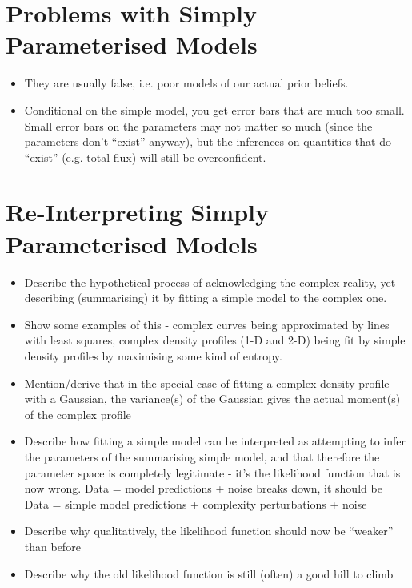 \documentclass[letterpaper, 11pt]{article}
\begin{document}
\section{Problems with Simply Parameterised Models}
\begin{itemize}
\item They are usually false, i.e. poor models of our actual prior beliefs. \\
\item Conditional on the simple model, you get error bars that are much too small. Small error bars on the parameters may not matter so much (since the parameters don't ``exist'' anyway), but the inferences on quantities that do ``exist'' (e.g. total flux) will still be overconfident. \\
\end{itemize}

\section{Re-Interpreting Simply Parameterised Models}

\begin{itemize}
\item Describe the hypothetical process of acknowledging the complex reality, yet describing (summarising) it by fitting a simple model to the complex one. \\
\item Show some examples of this - complex curves being approximated by lines with least squares, complex density profiles (1-D and 2-D) being fit by simple density profiles by maximising some kind of entropy.
\item Mention/derive that in the special case of fitting a complex density profile with a Gaussian, the variance(s) of the Gaussian gives the actual moment(s) of the complex profile
\item Describe how fitting a simple model can be interpreted as attempting to infer the parameters of the summarising simple model, and that therefore the parameter space is completely legitimate - it's the likelihood function that is now wrong. Data = model predictions + noise breaks down, it should be Data = simple model predictions + complexity perturbations + noise
\item Describe why qualitatively, the likelihood function should now be ``weaker'' than before
\item Describe why the old likelihood function is still (often) a good hill to climb
\end{itemize}
\end{document}
